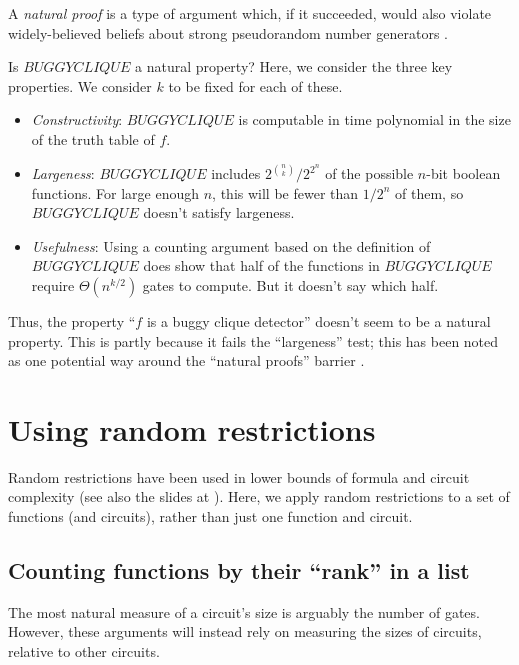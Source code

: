 \documentclass[12pt]{article}
\theoremstyle{definition}
\begin{document}
A {\em natural proof}
 is a type of argument which,
if it succeeded, would also violate widely-believed beliefs about
strong pseudorandom number generators
\cite{razborov1994natural}.

Is $BUGGYCLIQUE$ a natural property? Here, we consider the three key properties.
We consider $k$ to be fixed for each of these.

\begin{itemize}

\item {\em Constructivity}:
$BUGGYCLIQUE$ is computable in time polynomial in the size of
the truth table of $f$.

\item {\em Largeness}:
$BUGGYCLIQUE$ includes $2^{n \choose k} / 2^{2^n}$ of the possible $n$-bit
boolean functions. For large enough $n$, this will be fewer than $1 / 2^n$ of them,
so $BUGGYCLIQUE$ doesn't satisfy largeness.

\item {\em Usefulness}:
Using a counting argument based on
the definition of $BUGGYCLIQUE$ does show that
half of the functions
in $BUGGYCLIQUE$ require $\Theta(n^{k/2})$ gates to compute. But it doesn't say
which half.

\end{itemize}

Thus, the property ``$f$ is a buggy clique detector'' doesn't seem to be
a natural property. This is partly because it fails the ``largeness''
test; this has been noted as one potential way around the
``natural proofs'' barrier \cite{r_williams_blog_comment}.

\section{Using random restrictions}

Random restrictions have been used in lower bounds of formula
\cite{subbotovskaya1963comparison} and circuit \cite{hastad1987lower}
complexity (see also the slides at \cite{rossmanRestrictions}).
Here, we apply random restrictions to a set of functions (and circuits),
rather than just one function and circuit.

\subsection{Counting functions by their ``rank'' in a list}

The most natural measure of a circuit's size is arguably the number of gates.
However, these arguments will instead
rely on measuring the sizes of circuits, relative to other circuits.
\end{document}
